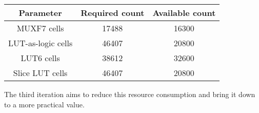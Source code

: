 \documentclass[a4paper,12pt]{article}
\begin{document}
\begin{table}[H]
    \centering
    \begin{tabular}{|c|c|c|}
        \hline
        \textbf{Parameter} & \textbf{Required count} & \textbf{Available count}
        \\
        \hline
        MUXF7 cells & 17488 & 16300\\
        LUT-as-logic cells & 46407 & 20800\\
        LUT6 cells & 38612 & 32600\\
        Slice LUT cells & 46407 & 20800\\
        \hline
    \end{tabular}
\end{table}

The third iteration aims to reduce this resource consumption and bring it down
to a more practical value.

\printbibliography
\end{document}
